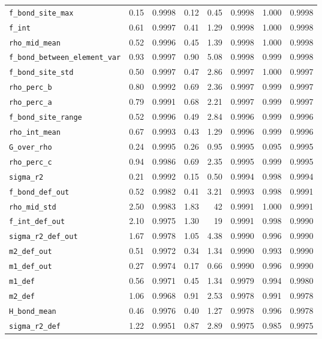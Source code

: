 \begin{table}[p]
\begin{tabular}{lrrrrrrr}
\texttt{f\_bond\_site\_max} & 0.15 & 0.9998 & 0.12 & 0.45 & 0.9998 & 1.000 & 0.9998 \\
\texttt{f\_int} & 0.61 & 0.9997 & 0.41 & 1.29 & 0.9998 & 1.000 & 0.9998 \\
\texttt{rho\_mid\_mean} & 0.52 & 0.9996 & 0.45 & 1.39 & 0.9998 & 1.000 & 0.9998 \\
\texttt{f\_bond\_between\_element\_var} & 0.93 & 0.9997 & 0.90 & 5.08 & 0.9998 & 0.999 & 0.9998 \\
\texttt{f\_bond\_site\_std} & 0.50 & 0.9997 & 0.47 & 2.86 & 0.9997 & 1.000 & 0.9997 \\
\texttt{rho\_perc\_b} & 0.80 & 0.9992 & 0.69 & 2.36 & 0.9997 & 0.999 & 0.9997 \\
\texttt{rho\_perc\_a} & 0.79 & 0.9991 & 0.68 & 2.21 & 0.9997 & 0.999 & 0.9997 \\
\texttt{f\_bond\_site\_range} & 0.52 & 0.9996 & 0.49 & 2.84 & 0.9996 & 0.999 & 0.9996 \\
\texttt{rho\_int\_mean} & 0.67 & 0.9993 & 0.43 & 1.29 & 0.9996 & 0.999 & 0.9996 \\
\texttt{G\_over\_rho} & 0.24 & 0.9995 & 0.26 & 0.95 & 0.9995 & 0.095 & 0.9995 \\
\texttt{rho\_perc\_c} & 0.94 & 0.9986 & 0.69 & 2.35 & 0.9995 & 0.999 & 0.9995 \\
\texttt{sigma\_r2} & 0.21 & 0.9992 & 0.15 & 0.50 & 0.9994 & 0.998 & 0.9994 \\
\texttt{f\_bond\_def\_out} & 0.52 & 0.9982 & 0.41 & 3.21 & 0.9993 & 0.998 & 0.9991 \\
\texttt{rho\_mid\_std} & 2.50 & 0.9983 & 1.83 & 42 & 0.9991 & 1.000 & 0.9991 \\
\texttt{f\_int\_def\_out} & 2.10 & 0.9975 & 1.30 & 19 & 0.9991 & 0.998 & 0.9990 \\
\texttt{sigma\_r2\_def\_out} & 1.67 & 0.9978 & 1.05 & 4.38 & 0.9990 & 0.996 & 0.9990 \\
\texttt{m2\_def\_out} & 0.51 & 0.9972 & 0.34 & 1.34 & 0.9990 & 0.993 & 0.9990 \\
\texttt{m1\_def\_out} & 0.27 & 0.9974 & 0.17 & 0.66 & 0.9990 & 0.996 & 0.9990 \\
\texttt{m1\_def} & 0.56 & 0.9971 & 0.45 & 1.34 & 0.9979 & 0.994 & 0.9980 \\
\texttt{m2\_def} & 1.06 & 0.9968 & 0.91 & 2.53 & 0.9978 & 0.991 & 0.9978 \\
\texttt{H\_bond\_mean} & 0.46 & 0.9976 & 0.40 & 1.27 & 0.9978 & 0.996 & 0.9978 \\
\texttt{sigma\_r2\_def} & 1.22 & 0.9951 & 0.87 & 2.89 & 0.9975 & 0.985 & 0.9975 \\

\end{tabular}
\end{table}
